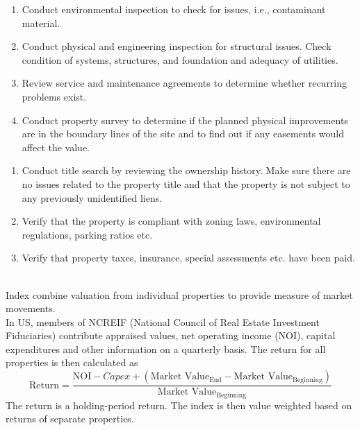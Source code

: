 \begin{remark} 
\begin{enumerate}[label=\roman*.]
\setlength{\itemsep}{0pt}
\item Conduct environmental inspection to check for issues, i.e., contaminant material.
\item Conduct physical and engineering inspection for structural issues. Check condition of systems, structures, and foundation and  adequacy of utilities.
\item Review service and maintenance agreements to determine whether recurring problems exist.
\item Conduct property survey to determine if the planned physical improvements are in the boundary lines of the site and to find out if any easements would affect the value.
\end{enumerate}
\end{remark}

\begin{remark} 
\begin{enumerate}[label=\roman*.]
\setlength{\itemsep}{0pt}
\item Conduct title search by reviewing the ownership history. Make sure there are no issues related to the property title and that the property is not subject to any previously unidentified liens.
\item Verify that the property is compliant with zoning laws, environmental regulations, parking ratios etc.
\item Verify that property taxes, insurance, special assessments etc. have been paid.
\end{enumerate}
\end{remark}

\begin{method} \\
Index combine valuation from individual properties to provide measure of market movements.\\
In US, members of NCREIF (National Council of Real Estate Investment Fiduciaries) contribute appraised values, net operating income (NOI), capital expenditures and other information on a quarterly basis. The return for all properties is then calculated as
\begin{equation}
\text{Return} = \frac{\text{NOI} - Capex + (\text{Market Value}_{\text{End}} - \text{Market Value}_{\text{Beginning}})}{\text{Market Value}_{\text{Beginning}}} \nonumber
\end{equation}
The return is a holding-period return. The index is then value weighted based on returns of separate properties.
\end{method}

